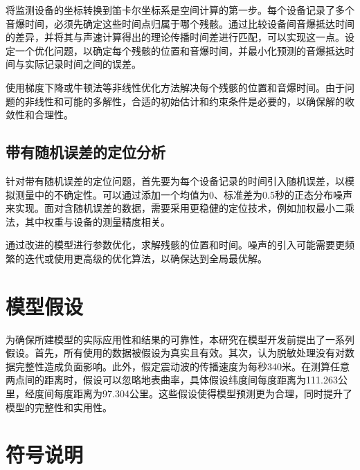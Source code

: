 \documentclass[withoutpreface,bwprint,12pt,a4paper]{cumcmthesis}
\begin{document}
将监测设备的坐标转换到笛卡尔坐标系是空间计算的第一步。每个设备记录了多个音爆时间，必须先确定这些时间点归属于哪个残骸。通过比较设备间音爆抵达时间的差异，并将其与声速计算得出的理论传播时间差进行匹配，可以实现这一点。设定一个优化问题，以确定每个残骸的位置和音爆时间，并最小化预测的音爆抵达时间与实际记录时间之间的误差。

使用梯度下降或牛顿法等非线性优化方法解决每个残骸的位置和音爆时间。由于问题的非线性和可能的多解性，合适的初始估计和约束条件是必要的，以确保解的收敛性和合理性。

\subsection{带有随机误差的定位分析}

针对带有随机误差的定位问题，首先要为每个设备记录的时间引入随机误差，以模拟测量中的不确定性。可以通过添加一个均值为0、标准差为0.5秒的正态分布噪声来实现。面对含随机误差的数据，需要采用更稳健的定位技术，例如加权最小二乘法，其中权重与设备的测量精度相关。

通过改进的模型进行参数优化，求解残骸的位置和时间。噪声的引入可能需要更频繁的迭代或使用更高级的优化算法，以确保达到全局最优解。

\section{模型假设}

为确保所建模型的实际应用性和结果的可靠性，本研究在模型开发前提出了一系列假设。首先，所有使用的数据被假设为真实且有效。其次，认为脱敏处理没有对数据完整性造成负面影响。此外，假定震动波的传播速度为每秒340米。在测算任意两点间的距离时，假设可以忽略地表曲率，具体假设纬度间每度距离为111.263公里，经度间每度距离为97.304公里。这些假设使得模型预测更为合理，同时提升了模型的完整性和实用性。

\section{符号说明}
\end{document}
